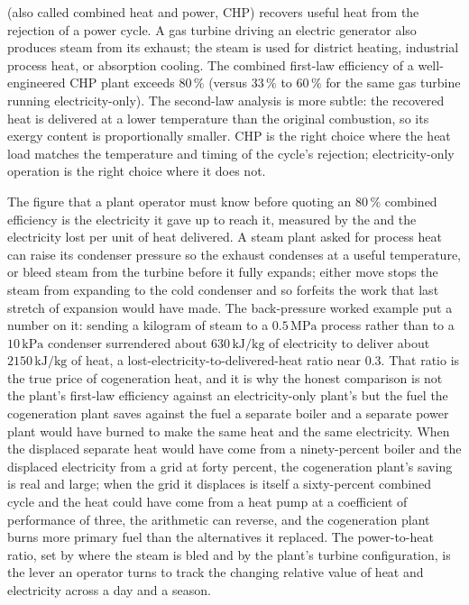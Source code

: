 

 (also called combined heat and power, CHP)
recovers useful heat from the rejection of a power cycle. A gas
turbine driving an electric generator also produces steam from its
exhaust; the steam is used for district heating, industrial process
heat, or absorption cooling. The combined first-law efficiency of a
well-engineered CHP plant exceeds $80\,\%$ (versus $33\,\%$ to $60\,\%$
for the same gas turbine running electricity-only). The second-law
analysis is more subtle: the recovered heat is delivered at a lower
temperature than the original combustion, so its exergy content is
proportionally smaller. CHP is the right choice where the heat load
matches the temperature and timing of the cycle's rejection;
electricity-only operation is the right choice where it does not.

The figure that a plant operator must know before quoting an $80\,\%$ combined
efficiency is the electricity it gave up to reach it, measured by the
 and the electricity lost per unit of heat delivered.
A steam plant asked for process heat can raise its condenser pressure so the exhaust
condenses at a useful temperature, or bleed steam from the turbine before it fully
expands; either move stops the steam from expanding to the cold condenser and so
forfeits the work that last stretch of expansion would have made. The back-pressure
worked example put a number on it: sending a kilogram of steam to a $0.5\,\text{MPa}$
process rather than to a $10\,\text{kPa}$ condenser surrendered about
$630\,\text{kJ}/\text{kg}$ of electricity to deliver about $2150\,\text{kJ}/\text{kg}$
of heat, a lost-electricity-to-delivered-heat ratio near $0.3$. That ratio is the
true price of cogeneration heat, and it is why the honest comparison is not the
plant's first-law efficiency against an electricity-only plant's but the fuel the
cogeneration plant saves against the fuel a separate boiler and a separate power
plant would have burned to make the same heat and the same electricity. When the
displaced separate heat would have come from a ninety-percent boiler and the
displaced electricity from a grid at forty percent, the cogeneration plant's saving
is real and large; when the grid it displaces is itself a sixty-percent combined
cycle and the heat could have come from a heat pump at a coefficient of performance
of three, the arithmetic can reverse, and the cogeneration plant burns more primary
fuel than the alternatives it replaced. The power-to-heat ratio, set by where the
steam is bled and by the plant's turbine configuration, is the lever an operator
turns to track the changing relative value of heat and electricity across a day and
a season.

